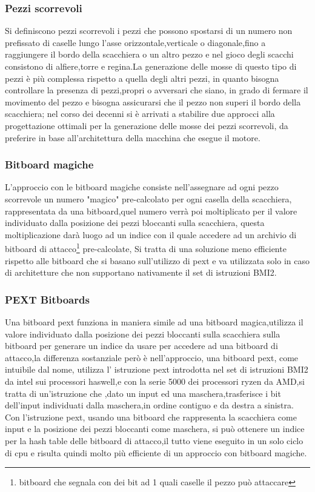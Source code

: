 \subsubsection{Pezzi  scorrevoli}
Si definiscono pezzi scorrevoli i pezzi che possono spostarsi di un numero non prefissato di caselle lungo l'asse orizzontale,verticale o diagonale,fino a raggiungere il bordo della scacchiera o un altro pezzo
e nel gioco degli scacchi consistono di alfiere,torre e regina.La generazione delle mosse di questo tipo di pezzi è più complessa rispetto a quella degli altri pezzi, in quanto bisogna controllare la presenza di pezzi,propri
o avversari che siano, in grado di fermare il movimento del pezzo e bisogna assicurarsi che il pezzo non superi il bordo della scacchiera;
nel corso  dei decenni si è arrivati a stabilire due approcci alla progettazione ottimali per la generazione delle mosse dei pezzi scorrevoli, 
da preferire in base all'architettura della macchina che esegue il motore.

\subsubsection{Bitboard magiche}
L'approccio con le bitboard magiche consiste nell'assegnare ad ogni pezzo scorrevole un numero "magico" pre-calcolato per ogni casella della scacchiera, rappresentata da una bitboard,quel numero verrà poi moltiplicato
 per il valore individuato dalla posizione dei pezzi bloccanti sulla scacchiera,
questa moltiplicazione darà luogo ad un indice con il quale accedere ad un archivio di bitboard di 
attacco\footnote{bitboard che segnala con dei bit ad 1 quali caselle il pezzo può attaccare} pre-calcolate, Si tratta di una soluzione meno efficiente rispetto alle bitboard che si basano sull'utilizzo di pext
e va utilizzata solo in caso di architetture che non supportano nativamente il set di istruzioni BMI2.


\subsubsection{PEXT Bitboards}
Una bitboard pext funziona in maniera simile ad una bitboard magica,utilizza il valore individuato dalla posizione dei pezzi bloccanti sulla scacchiera sulla bitboard per generare un indice da usare per accedere ad una
bitboard di attacco,la differenza sostanziale però è nell'approccio, una bitboard pext, come intuibile dal nome, utilizza l' istruzione pext introdotta nel set di istruzioni BMI2 da intel sui processori haswell,e con 
la serie 5000 dei processori ryzen da AMD,si tratta di un'istruzione che ,dato un input ed una maschera,trasferisce i bit dell'input individuati dalla maschera,in ordine contiguo e da destra a sinistra.
Con l'istruzione pext, usando una bitboard che rappresenta la scacchiera come input e la posizione dei pezzi bloccanti come maschera, si può ottenere un indice per la hash table delle bitboard di attacco,il tutto viene eseguito in un solo ciclo 
di cpu e risulta quindi molto più efficiente di un approccio con bitboard magiche.




